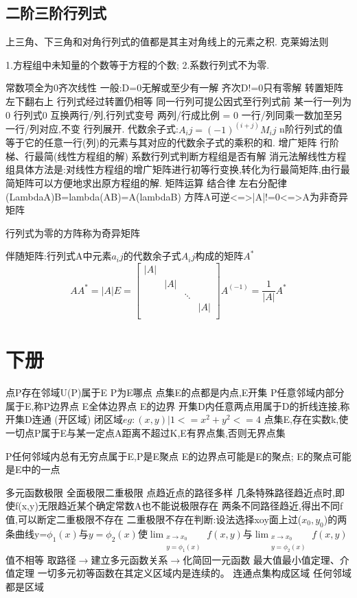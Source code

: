 \documentclass[10pt, a4paper, oneside]{ctexart}
\begin{document}
\begin{sloppypar}
	\subsection{二阶三阶行列式}
	上三角、下三角和对角行列式的值都是其主对角线上的元素之积.
	克莱姆法则
	\begin{center}
		1.方程组中未知量的个数等于方程的个数;
		2.系数行列式不为零.
	\end{center}
	常数项全为0齐次线性
	一般:D=0无解或至少有一解
	齐次D!=0只有零解
	转置矩阵左下翻右上
	行列式经过转置仍相等
	同一行列可提公因式至行列式前
	某一行一列为0 行列式0
	互换两行/列,行列式变号
	两列/行成比例 = 0
	一行/列同乘一数加至另一行/列对应,不变
	行列展开.
	代数余子式:$A_ij=(-1)^(i + j)M_ij$
	n阶行列式的值等于它的任意一行(列)的元素与其对应的代数余子式的乘积的和.
	增广矩阵
	行阶梯、行最简(线性方程组的解)
	系数行列式判断方程组是否有解
	消元法解线性方程组具体方法是:对线性方程组的增广矩阵进行初等行变换,转化为行最简矩阵,由行最简矩阵可以方便地求出原方程组的解.
	矩阵运算
	结合律
	左右分配律
	(LambdaA)B=lambda(AB)=A(lambdaB)
	方阵A可逆<=>|A|!=0<=>A为非奇异矩阵

	行列式为零的方阵称为奇异矩阵

	伴随矩阵:行列式A中元素$a_ij$的代数余子式$A_ij$构成的矩阵$A^*$
	$$
		AA^*=|A|E=\begin{bmatrix}
			|A| &     &        &     \\
			    & |A| &        &     \\
			    &     & \ddots &     \\
			    &     &        & |A| \\
		\end{bmatrix}
		A^(-1) = \frac{1}{|A|}A^*
	$$
	\section{下册}
	点P存在邻域U(P)属于E P为E哪点
	点集E的点都是内点,E开集
	P任意邻域内部分属于E,称P边界点
	E全体边界点 E的边界
	开集D内任意两点用属于D的折线连接,称开集D连通
	(开区域)
	闭区域$eg:{(x,y)|1<=x^2 + y^2<=4}$
	点集E,存在实数k,使一切点P属于E与某一定点A距离不超过K,E有界点集,否则无界点集

	P任何邻域内总有无穷点属于E,P是E聚点
	E的边界点可能是E的聚点;
	E的聚点可能是E中的一点

	多元函数极限
	全面极限二重极限
	点趋近点的路径多样
	几条特殊路径趋近点时,即使f(x,y)无限趋近某个确定常数A也不能说极限存在
	两条不同路径趋近,得出不同f值,可以断定二重极限不存在
	二重极限不存在判断:设法选择xoy面上过($x_0, y_0$)的两条曲线y=$\phi_1(x)$与$y=\phi_2(x)$使$\lim_{\substack{x \to x_0\\y=\phi_1(x)}}f(x,y)$与$\lim_{\substack{x \to x_0\\y=\phi_2(x)}}f(x,y)$值不相等
	取路径$\to$建立多元函数关系$\to$化简回一元函数
	最大值最小值定理、介值定理
	一切多元初等函数在其定义区域内是连续的。
	连通点集构成区域
	任何邻域都是区域


\end{sloppypar}
\end{document}
